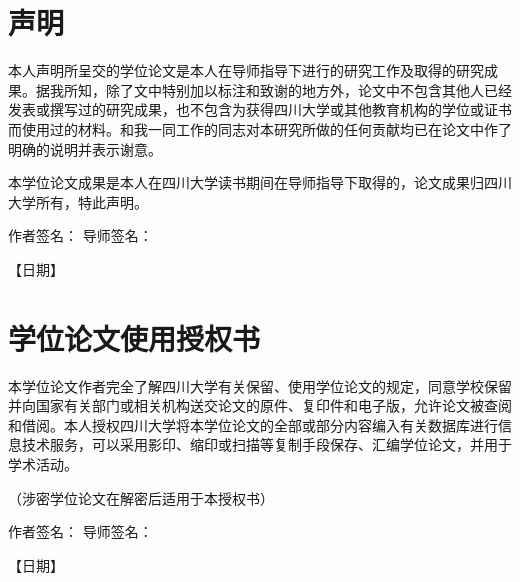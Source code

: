 

\section*{声明}

本人声明所呈交的学位论文是本人在导师指导下进行的研究工作及取得的研究成果。据我所知，除了文中特别加以标注和致谢的地方外，论文中不包含其他人已经发表或撰写过的研究成果，也不包含为获得四川大学或其他教育机构的学位或证书而使用过的材料。和我一同工作的同志对本研究所做的任何贡献均已在论文中作了明确的说明并表示谢意。

本学位论文成果是本人在四川大学读书期间在导师指导下取得的，论文成果归四川大学所有，特此声明。

\vspace{1cm}
\noindent
\hspace{2em}作者签名：\hspace{4cm}
\hfill
导师签名：\hspace{4cm}

\begin{flushright}
    { 【日期】}
\end{flushright}

\vspace{4cm}

\section*{学位论文使用授权书}

本学位论文作者完全了解四川大学有关保留、使用学位论文的规定，同意学校保留并向国家有关部门或相关机构送交论文的原件、复印件和电子版，允许论文被查阅和借阅。本人授权四川大学将本学位论文的全部或部分内容编入有关数据库进行信息技术服务，可以采用影印、缩印或扫描等复制手段保存、汇编学位论文，并用于学术活动。

（涉密学位论文在解密后适用于本授权书）

\vspace{1cm}
\noindent
\hspace{2em}作者签名：\hspace{4cm}
\hfill
导师签名：\hspace{4cm}

\begin{flushright}
    { 【日期】}
\end{flushright}